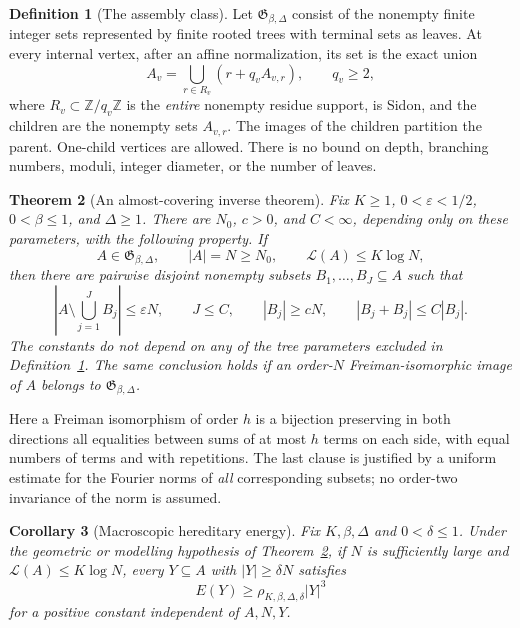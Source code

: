 \documentclass[11pt,reqno]{amsart}
\numberwithin{equation}{section}
\newtheorem{theorem}{Theorem}[section]
\newtheorem{corollary}[theorem]{Corollary}
\theoremstyle{definition}
\newtheorem{definition}[theorem]{Definition}
\theoremstyle{remark}
\newcommand{\Z}{\mathbb Z}
\newcommand{\La}{\mathcal L}
\newcommand{\eps}{\varepsilon}
\begin{document}
\begin{definition}[The assembly class]\label{def:class}
Let $\mathfrak G_{\beta,\Delta}$ consist of the nonempty finite integer
sets represented by finite rooted trees with terminal sets as leaves.
At every internal vertex, after an affine normalization, its set is the
exact union
\begin{equation}\label{eq:node}
 A_v=\bigcup_{r\in R_v}(r+q_v A_{v,r}),\qquad q_v\ge2,
\end{equation}
where $R_v\subset\Z/q_v\Z$ is the \emph{entire} nonempty residue support,
is Sidon, and the children are the nonempty sets $A_{v,r}$. The images
of the children partition the parent. One-child vertices are allowed.
There is no bound on depth, branching numbers, moduli, integer diameter,
or the number of leaves.
\end{definition}

\begin{theorem}[An almost-covering inverse theorem]\label{thm:inverse}
Fix $K\ge1$, $0<\eps<1/2$, $0<\beta\le1$, and $\Delta\ge1$. There are
$N_0$, $c>0$, and $C<\infty$, depending only on these parameters, with the
following property. If
\[
 A\in\mathfrak G_{\beta,\Delta},\qquad |A|=N\ge N_0,
 \qquad \La(A)\le K\log N,
\]
then there are pairwise disjoint nonempty subsets $B_1,\ldots,B_J\subseteq A$
such that
\begin{equation}\label{eq:cover-conclusion}
 \left|A\setminus\bigcup_{j=1}^J B_j\right|\le\eps N,
 \qquad J\le C,\qquad |B_j|\ge cN,\qquad
 |B_j+B_j|\le C|B_j|.
\end{equation}
The constants do not depend on any of the tree parameters excluded in
Definition~\ref{def:class}.
The same conclusion holds if an order-$N$ Freiman-isomorphic image of
$A$ belongs to $\mathfrak G_{\beta,\Delta}$.
\end{theorem}

Here a Freiman isomorphism of order $h$ is a bijection preserving in both
directions all equalities between sums of at most $h$ terms on each side,
with equal numbers of terms and with repetitions. The last clause is
justified by a uniform estimate for the Fourier norms of \emph{all}
corresponding subsets; no order-two invariance of the norm is assumed.

\begin{corollary}[Macroscopic hereditary energy]\label{cor:main-hered}
Fix $K,\beta,\Delta$ and $0<\delta\le1$. Under the geometric or modelling
hypothesis of Theorem~\ref{thm:inverse}, if $N$ is sufficiently large and
$\La(A)\le K\log N$, every $Y\subseteq A$ with $|Y|\ge\delta N$ satisfies
\[
 E(Y)\ge\rho_{K,\beta,\Delta,\delta}|Y|^3
\]
for a positive constant independent of $A,N,Y$.
\end{corollary}
\end{document}
